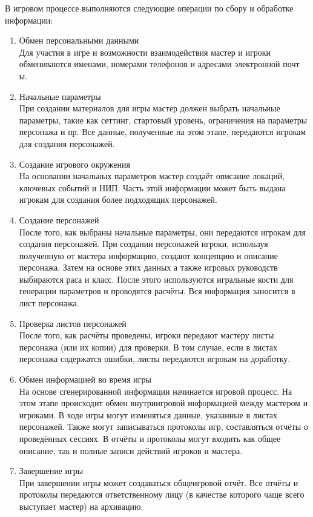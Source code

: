 
В игровом процессе выполняются следующие операции по сбору и обработке информации:
\begin{enumerate}
\item Обмен персональными данными\\
Для участия в игре и возможности взаимодействия мастер и игроки обмениваются именами, номерами телефонов и адресами электронной почт
ы.
\item Начальные параметры\\
При создании материалов для игры мастер должен выбрать начальные параметры, такие как сеттинг, стартовый уровень, ограничения на параметры персонажа и пр. Все данные, полученные на этом этапе, передаются игрокам для создания персонажей.

\item Создание игрового окружения\\
На основании начальных параметров мастер создаёт описание локаций, ключевых событий и НИП. Часть этой информации может быть выдана игрокам для создания более подходящих персонажей.
\item Создание персонажей\\
После того, как выбраны начальные параметры, они передаются игрокам для создания персонажей. При создании персонажей игроки, используя полученную от мастера информацию, создают концепцию и описание персонажа. Затем на основе этих данных а также игровых руководств выбираются раса и класс. После этого используются игральные кости для генерации параметров и проводятся расчёты. Вся информация заносится в лист персонажа.
\item Проверка листов персонажей\\
После того, как расчёты проведены, игроки передают мастеру листы персонажа (или их копии) для проверки. В том случае, если в листах персонажа содержатся ошибки, листы передаются игрокам на доработку.
\item Обмен информацией во время игры\\
На основе сгенерированной информации начинается игровой процесс. На этом этапе происходит обмен внутриигровой информацией между мастером и игроками. В ходе игры могут изменяться данные, указанные в листах персонажей. Также могут записываться протоколы игр, составляться отчёты о проведённых сессиях. В отчёты и протоколы могут входить как общее описание, так и полные записи действий игроков и мастера.
\item Завершение игры\\
При завершении игры может создаваться общеигровой отчёт. Все отчёты и протоколы передаются ответственному лицу (в качестве которого чаще всего выступает мастер) на архивацию.
\end{enumerate}
